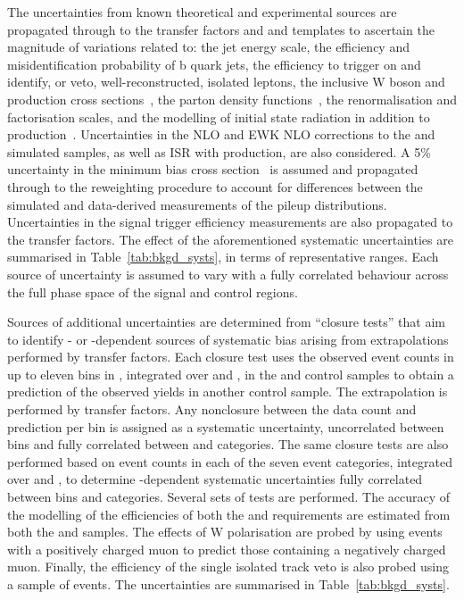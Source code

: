 The uncertainties from known theoretical and experimental sources are
propagated through to the transfer factors and \mht and \nb templates
to ascertain the magnitude of variations related to: the jet energy
scale, the efficiency and misidentification probability of b quark
jets, the efficiency to trigger on and identify, or veto,
well-reconstructed, isolated leptons, the inclusive W boson and \ttbar
production cross sections~\cite{}, the parton density
functions~\cite{}, the renormalisation and factorisation scales, and
the modelling of initial state radiation in addition to \ttbar
production~\cite{}. Uncertainties in the NLO and EWK NLO corrections
to the \wj and \zj simulated samples, as well as ISR with \ttbar
production, are also considered. A 5\% uncertainty in the minimum bias
cross section~\cite{} is assumed and propagated through to the
reweighting procedure to account for differences between the simulated
and data-derived measurements of the pileup
distributions. Uncertainties in the signal trigger efficiency
measurements are also propagated to the transfer factors. The effect
of the aforementioned systematic uncertainties are summarised in
Table~\ref{tab:bkgd_systs}, in terms of representative ranges.  Each
source of uncertainty is assumed to vary with a fully correlated
behaviour across the full phase space of the signal and control
regions.

Sources of additional uncertainties are determined from ``closure
tests'' that aim to identify \njet- or \scalht-dependent sources of
systematic bias arising from extrapolations performed by transfer
factors. Each closure test uses the observed event counts in up to
eleven bins in \scalht, integrated over \njet and \nb, in the \mj and
\mmj control samples to obtain a prediction of the observed yields in
another control sample. The extrapolation is performed by transfer
factors. Any nonclosure between the data count and prediction per
\scalht bin is assigned as a systematic uncertainty, uncorrelated
between \scalht bins and fully correlated between \njet and \nb
categories. The same closure tests are also performed based on event
counts in each of the seven \njet event categories, integrated over
\scalht and \nb, to determine \njet-dependent systematic uncertainties
fully correlated between \scalht bins and \nb categories. Several sets
of tests are performed. The accuracy of the modelling of the
efficiencies of both the \alphat and \bdphi requirements are estimated
from both the \mj and \mmj samples. The effects of W polarisation are
probed by using \mj events with a positively charged muon to predict
those containing a negatively charged muon. Finally, the efficiency of
the single isolated track veto is also probed using a sample of \mj
events. The uncertainties are summarised in
Table~\ref{tab:bkgd_systs}.

